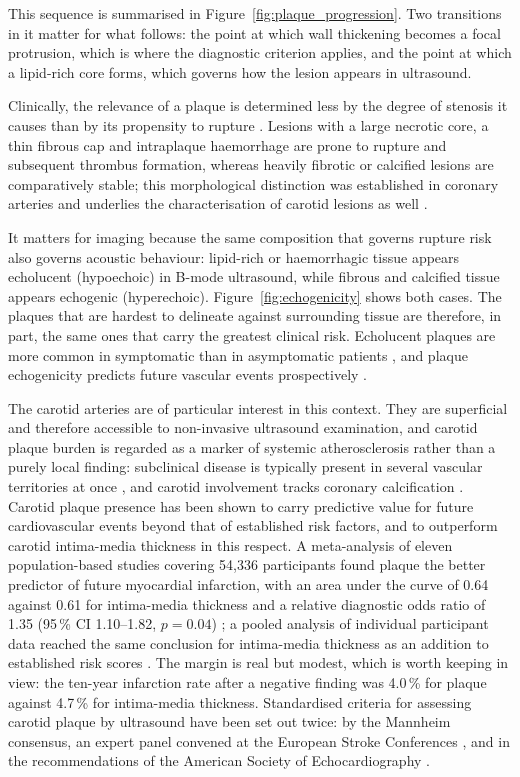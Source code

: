 This sequence is summarised in Figure~\ref{fig:plaque_progression}. Two transitions in it matter
for what follows: the point at which wall thickening becomes a focal protrusion, which is where
the diagnostic criterion applies, and the point at which a lipid-rich core forms, which governs
how the lesion appears in ultrasound.

Clinically, the relevance of a plaque is determined less by the degree of
stenosis it causes than by its propensity to rupture \cite{naghavi2003vulnerable}.
Lesions with a large necrotic core, a thin fibrous cap and intraplaque haemorrhage
are prone to rupture and subsequent thrombus formation, whereas heavily fibrotic or
calcified lesions are comparatively stable; this morphological distinction was
established in coronary arteries \cite{virmani2000lessons} and underlies the
characterisation of carotid lesions as well \cite{libby2021}.

It matters for imaging because the same composition that governs rupture risk also
governs acoustic behaviour: lipid-rich or haemorrhagic tissue appears echolucent
(hypoechoic) in B-mode ultrasound, while fibrous and calcified tissue appears
echogenic (hyperechoic). Figure~\ref{fig:echogenicity} shows both cases. The plaques
that are hardest to delineate against surrounding tissue are therefore, in part, the same ones
that carry the greatest clinical risk. Echolucent plaques are more common in symptomatic than
in asymptomatic patients \cite{plonski2024gsm}, and plaque echogenicity predicts future
vascular events prospectively \cite{tadokoro2014echogenicity}.

The carotid arteries are of particular interest in this context. They are
superficial and therefore accessible to non-invasive ultrasound examination, and
carotid plaque burden is regarded as a marker of systemic atherosclerosis rather
than a purely local finding: subclinical disease is typically present in several
vascular territories at once \cite{fernandezfriera2015pesa}, and carotid involvement
tracks coronary calcification \cite{laclaustra2016femoral}. Carotid plaque presence has been shown to carry
predictive value for future cardiovascular events beyond that of established
risk factors, and to outperform carotid intima-media thickness in this respect. A meta-analysis
of eleven population-based studies covering 54{,}336 participants found plaque the better
predictor of future myocardial infarction, with an area under the curve of 0.64 against 0.61 for
intima-media thickness and a relative diagnostic odds ratio of 1.35 (95\,\% CI 1.10--1.82,
$p = 0.04$) \cite{inaba2012carotid}; a pooled analysis of individual participant data reached the
same conclusion for intima-media thickness as an addition to established risk scores
\cite{denruijter2012cimt}. The margin is real but modest, which is worth keeping in view: the
ten-year infarction rate after a negative finding was 4.0\,\% for plaque against 4.7\,\% for
intima-media thickness. Standardised criteria for assessing carotid
plaque by ultrasound have been set out twice: by the Mannheim consensus, an expert panel
convened at the European Stroke Conferences \cite{touboul2012mannheim}, and in the
recommendations of the American Society of Echocardiography
\cite{johri2020recommendations}.

